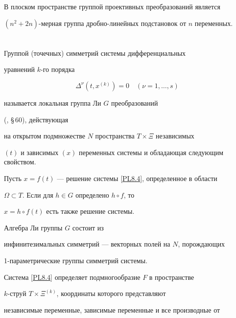 В плоском пространстве группой проективных преобразований является


$(n^2+2n)$-мерная группа дробно-линейных подстановок от $n$ переменных.











\section{} \label{par5}





Группой (точечных) симметрий системы дифференциальных


уравнений $k$-го порядка


\begin{equation}\label{PL8.4}


\Delta^\nu (t,x^{(k)})=0 \quad (\nu =1,\dotsc,s)


\end{equation}


называется локальная группа Ли $G$ преобразований


(\cite{Pontryagin_73}, \S\,60), действующая


на открытом подмножестве $N$ пространства $T\times \Xi$ независимых


$(t)$ и зависимых $(x)$ переменных системы и обладающая следующим свойством.


Пусть $x=f(t)$ --- решение системы \eqref{PL8.4}, определенное в области


$\Omega \subset T$. Если для $h\in G$ определено $h \circ f$, то


$x=h\circ f(t)$ есть также решение системы.





Алгебра Ли группы $G$ состоит из


инфинитезимальных симметрий --- векторных полей на $N$, порождающих


1-параметрические группы симметрий системы.





Система \eqref{PL8.4} определяет подмногообразие $F$ в пространстве


$k$-струй $T\times \Xi^{(k)}$, координаты которого представляют


независимые переменные, зависимые переменные и все производные от 


